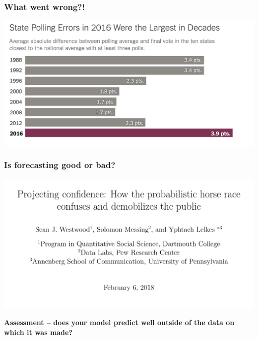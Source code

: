 \documentclass[aspectratio=169]{beamer}
\theoremstyle{principle}
\begin{document}
\begin{frame}
\frametitle{What went wrong?!}

\begin{center}
\includegraphics[scale=0.3]{state-errors.png}
\end{center}
\end{frame}

\begin{frame}
\frametitle{Is forecasting good or bad?}

\begin{center}
\includegraphics[scale=0.4]{uncertainty.png}
\end{center}
\end{frame}

\begin{frame}

\begin{center}
\Huge\textbf{Assessment -- does your model predict well outside of the data on which it was made?}\\
\end{center}

\end{frame}
\end{document}
